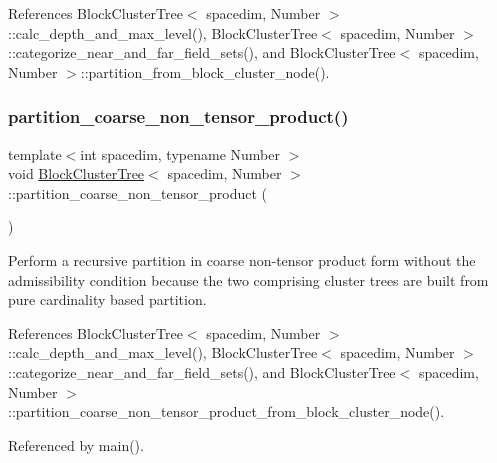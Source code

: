 References Block\+Cluster\+Tree$<$ spacedim, Number $>$\+::calc\+\_\+depth\+\_\+and\+\_\+max\+\_\+level(), Block\+Cluster\+Tree$<$ spacedim, Number $>$\+::categorize\+\_\+near\+\_\+and\+\_\+far\+\_\+field\+\_\+sets(), and Block\+Cluster\+Tree$<$ spacedim, Number $>$\+::partition\+\_\+from\+\_\+block\+\_\+cluster\+\_\+node().

\mbox{\label{classBlockClusterTree_a0e40b3884535eae57d00c078ec782459}} 
\subsubsection{\texorpdfstring{partition\+\_\+coarse\+\_\+non\+\_\+tensor\+\_\+product()}{partition\_coarse\_non\_tensor\_product()}}
{\footnotesize\ttfamily template$<$int spacedim, typename Number $>$ \\
void \hyperlink{classBlockClusterTree}{Block\+Cluster\+Tree}$<$ spacedim, Number $>$\+::partition\+\_\+coarse\+\_\+non\+\_\+tensor\+\_\+product (\begin{DoxyParamCaption}{ }\end{DoxyParamCaption})}

Perform a recursive partition in coarse non-\/tensor product form without the admissibility condition because the two comprising cluster trees are built from pure cardinality based partition. 

References Block\+Cluster\+Tree$<$ spacedim, Number $>$\+::calc\+\_\+depth\+\_\+and\+\_\+max\+\_\+level(), Block\+Cluster\+Tree$<$ spacedim, Number $>$\+::categorize\+\_\+near\+\_\+and\+\_\+far\+\_\+field\+\_\+sets(), and Block\+Cluster\+Tree$<$ spacedim, Number $>$\+::partition\+\_\+coarse\+\_\+non\+\_\+tensor\+\_\+product\+\_\+from\+\_\+block\+\_\+cluster\+\_\+node().



Referenced by main().

\mbox{\label{classBlockClusterTree_a61b6c204f3f1d5ff7c71a07b26ca9d09}} 
